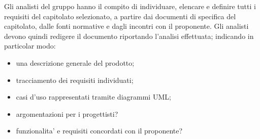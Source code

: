Gli analisti del gruppo \Gruppo{} hanno il compito di individuare, elencare e definire tutti i requisiti del capitolato selezionato, a partire dai documenti di specifica del capitolato, dalle fonti normative e dagli incontri con il proponente. Gli analisti devono quindi redigere il documento \AdRv{} riportando l'analisi effettuata; indicando in particolar modo:

\begin{itemize}
    \item una descrizione generale del prodotto;
    \item tracciamento dei requisiti individuati;
    \item casi d'uso rappresentati tramite diagrammi UML;
    \item argomentazioni per i progettisti?
    \item funzionalita' e requisiti concordati con il proponente?
\end{itemize}